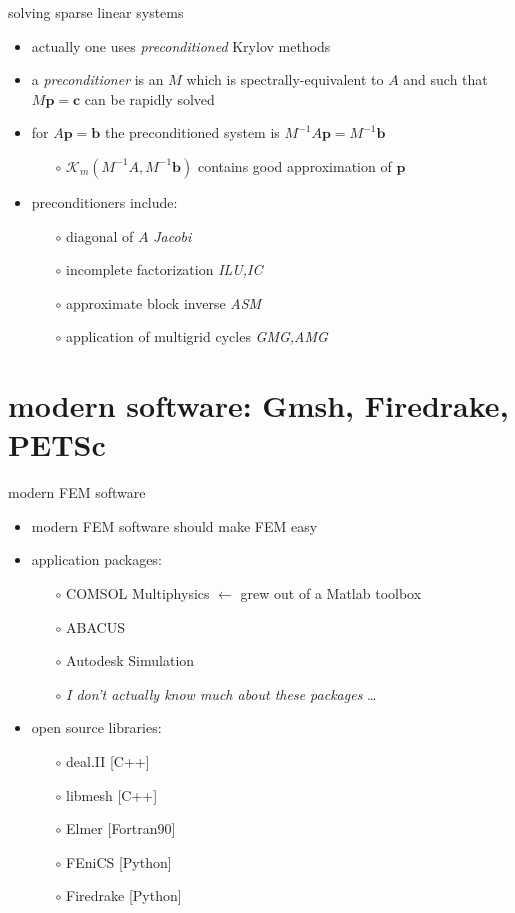 \documentclass[hide notes,intlimits,usenames,dvipsnames]{beamer}
\newcommand{\bb}{\mathbf{b}}
\newcommand{\bc}{\mathbf{c}}
\newcommand{\bp}{\mathbf{p}}
\begin{document}
\begin{frame}{solving sparse linear systems}
\begin{itemize}
\item actually one uses \emph{preconditioned} Krylov methods
\item a \emph{preconditioner} is an $M$ which is spectrally-equivalent to $A$ and such that $M\bp=\bc$ can be rapidly solved
\item for $A\bp=\bb$ the preconditioned system is $M^{-1} A \bp = M^{-1} \bb$
    \begin{itemize}
    \item[$\circ$] $\mathcal{K}_m(M^{-1} A,M^{-1} \bb)$ contains good approximation of $\bp$
    \end{itemize}
\item preconditioners include:
    \begin{itemize}
    \item[$\circ$] diagonal of $A$ \hfill \emph{Jacobi}
    \item[$\circ$] incomplete factorization \hfill \emph{ILU,IC}
    \item[$\circ$] approximate block inverse \hfill \emph{ASM}
    \item[$\circ$] application of multigrid cycles \hfill \emph{GMG,AMG}
    \end{itemize}
\end{itemize}
\end{frame}


\section{modern software: Gmsh, Firedrake, PETSc}

\begin{frame}{modern FEM software}

\begin{itemize}
\item modern FEM software should make FEM easy
\item application packages:
    \begin{itemize}
    \item[$\circ$] COMSOL Multiphysics  \hfill $\leftarrow$ grew out of a Matlab toolbox
    \item[$\circ$] ABACUS
    \item[$\circ$] Autodesk Simulation
    \item[$\circ$] \emph{I don't actually know much about these packages} \dots
    \end{itemize}
\item open source libraries:
    \begin{itemize}
    \item[$\circ$] deal.II [C++]
    \item[$\circ$] libmesh [C++]
    \item[$\circ$] Elmer [Fortran90]
    \item[$\circ$] FEniCS [Python]
    \item[$\circ$] Firedrake [Python]
    \end{itemize}

\end{itemize}
\end{frame}
\end{document}
